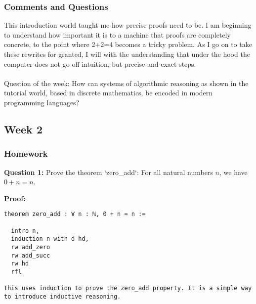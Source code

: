 \documentclass{article}
\theoremstyle{theorem}
\theoremstyle{definition}
\theoremstyle{remark}
\begin{document}
{%
%
%

\subsubsection*{Comments and Questions}

This introduction world taught me how precise proofs need to be. I am beginning to understand how important it is to a machine that proofs are completely concrete, to the point where 2+2=4 becomes a tricky problem. As I go on to take these rewrites for granted, I will with the understanding that under the hood the computer does not go off intuition, but precise and exact steps. \\\\
 Question of the week:
How can systems of algorithmic reasoning as shown in the tutorial world, based in discrete mathematics, be encoded in modern programming languages?

\subsection{Week 2}


\subsubsection*{Homework}

\textbf{Question 1:} Prove the theorem `zero\_add`: For all natural numbers \( n \), we have \( 0 + n = n \).

\textbf{Proof:}
\begin{verbatim}
theorem zero_add : ∀ n : ℕ, 0 + n = n :=

  intro n,
  induction n with d hd,
  rw add_zero
  rw add_succ
  rw hd
  rfl

This uses induction to prove the zero_add property. It is a simple way to introduce inductive reasoning.
\end{verbatim}

}
\end{document}
